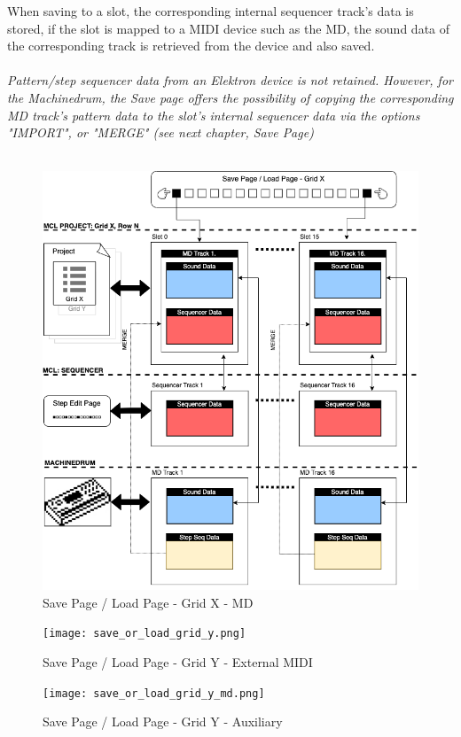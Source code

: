 When saving to a slot, the corresponding internal sequencer track's data is stored, if the slot is mapped to a MIDI device such as the MD, the sound data of the corresponding track is retrieved from the device and also saved.\\
\\
\textit{Pattern/step sequencer data from an Elektron device is not retained. However, for the Machinedrum, the Save page offers the possibility of copying the corresponding MD track's pattern data to the slot's internal sequencer data via the options "IMPORT", or "MERGE" (see next chapter, Save Page)}
\\\\

\begin{figure}
    \centering
    \includegraphics[scale=0.7]{save_or_load_grid_x.png}
    \caption{Save Page / Load Page - Grid X - MD }
    \label{fig:my_label}
\end{figure}
\begin{figure}
    \centering
    \texttt{[image: save\_or\_load\_grid\_y.png]}
    \caption{Save Page / Load Page - Grid Y - External MIDI}
    \label{fig:my_label}
\end{figure}
\begin{figure}
    \centering
    \texttt{[image: save\_or\_load\_grid\_y\_md.png]}
    \caption{Save Page / Load Page - Grid Y - Auxiliary}
    \label{fig:my_label}
\end{figure}
